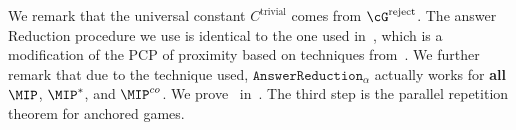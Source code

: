 
We remark that the universal constant $C^{\text{trivial}}$ comes from $\cG^{\text{reject}}$. The answer Reduction  procedure we use is identical to the one used in~\cite[Chapter 10]{jiMIPRE2022a}, which is a modification of the PCP of proximity based on techniques from~\cite{babaiNondeterministicExponentialTime1991a}. We further remark that due to the technique used, $\texttt{AnswerReduction}_{\alpha}$ actually works for \textbf{all} $\MIP$, $\MIP^*$, and $\MIP^{co}$. We prove~ in~. The third step is the parallel repetition theorem for anchored games. 


